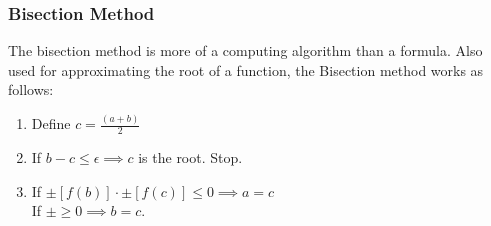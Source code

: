 \documentclass{beamer}
\begin{document}
\begin{frame}
\frametitle{\color{orange}Bisection Method}
The bisection method is more of a computing algorithm than a formula. Also used for approximating the root of a function, the Bisection method works as follows:
\vspace{1cm}
\color{purple}
\begin{center}
\begin{enumerate}
\item Define $c = \frac{(a+b)}{2}$ \pause
\item If $b - c \le \epsilon \implies c$ is the root. Stop.\pause
\item If $\pm [f(b)] \cdot \pm [f(c)] \le 0 \implies a=c$ \\ If $\pm \ge 0 \implies b = c$.
\end{enumerate}
\end{center}
\end{frame}
\end{document}
